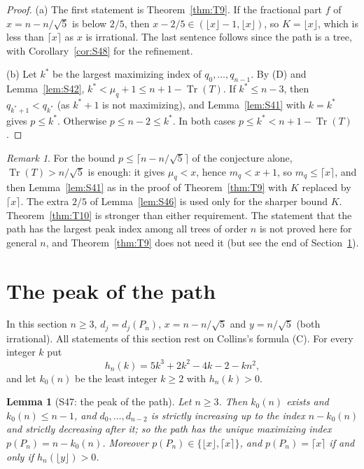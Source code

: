 \documentclass[11pt]{amsart}
\newtheorem{lemma}[theorem]{Lemma}
\theoremstyle{definition}
\theoremstyle{remark}
\newtheorem{remark}[theorem]{Remark}
\newcommand{\Tr}{\operatorname{Tr}}
\begin{document}
\begin{proof}
(a) The first statement is Theorem~\ref{thm:T9}. If the fractional part
$f$ of $x=n-n/\sqrt5$ is below $2/5$, then
$x-2/5\in(\lfloor x\rfloor-1,\lfloor x\rfloor)$, so $K=\lfloor x\rfloor$, which
is less than $\lceil x\rceil$ as $x$ is irrational. The last sentence follows
since the path is a tree, with Corollary~\ref{cor:S48} for the refinement.

(b) Let $k^*$ be the largest maximizing index of $q_0,\dots,q_{n-1}$. By (D)
and Lemma~\ref{lem:S42}, $k^*<\mu_q+1\le n+1-\Tr(T)$. If $k^*\le n-3$, then
$q_{k^*+1}<q_{k^*}$ (as $k^*+1$ is not maximizing), and Lemma~\ref{lem:S41}
with $k=k^*$ gives $p\le k^*$. Otherwise $p\le n-2\le k^*$. In both cases
$p\le k^*<n+1-\Tr(T)$.
\end{proof}

\begin{remark}
For the bound $p\le\lceil n-n/\sqrt5\rceil$ of the conjecture alone,
$\Tr(T)>n/\sqrt5$ is enough: it gives $\mu_q<x$, hence $m_q<x+1$, so
$m_q\le\lceil x\rceil$, and then Lemma~\ref{lem:S41} as in the proof of
Theorem~\ref{thm:T9} with $K$ replaced by $\lceil x\rceil$. The extra $2/5$
of Lemma~\ref{lem:S46} is used only for the sharper bound $K$.
Theorem~\ref{thm:T10} is stronger than either requirement. The statement
that the path has the largest peak index among all trees of order $n$ is
not proved here for general $n$, and Theorem~\ref{thm:T9} does not need it
(but see the end of Section~\ref{sec:path}).
\end{remark}

\section{The peak of the path}\label{sec:path}

In this section $n\ge3$, $d_j=d_j(P_n)$, $x=n-n/\sqrt5$ and $y=n/\sqrt5$
(both irrational). All statements of this section rest on Collins's formula
(C). For every integer $k$ put
\[
h_n(k)=5k^3+2k^2-4k-2-kn^2,
\]
and let $k_0(n)$ be the least integer $k\ge2$ with $h_n(k)>0$.

\begin{lemma}[S47: the peak of the path]\label{lem:S47}
Let $n\ge3$. Then $k_0(n)$ exists and $k_0(n)\le n-1$, and
$d_0,\dots,d_{n-2}$ is strictly increasing up to the index $n-k_0(n)$ and
strictly decreasing after it; so the path has the unique maximizing index
$p(P_n)=n-k_0(n)$. Moreover $p(P_n)\in\{\lfloor x\rfloor,\lceil x\rceil\}$, and
$p(P_n)=\lceil x\rceil$ if and only if $h_n(\lfloor y\rfloor)>0$.
\end{lemma}
\end{document}

